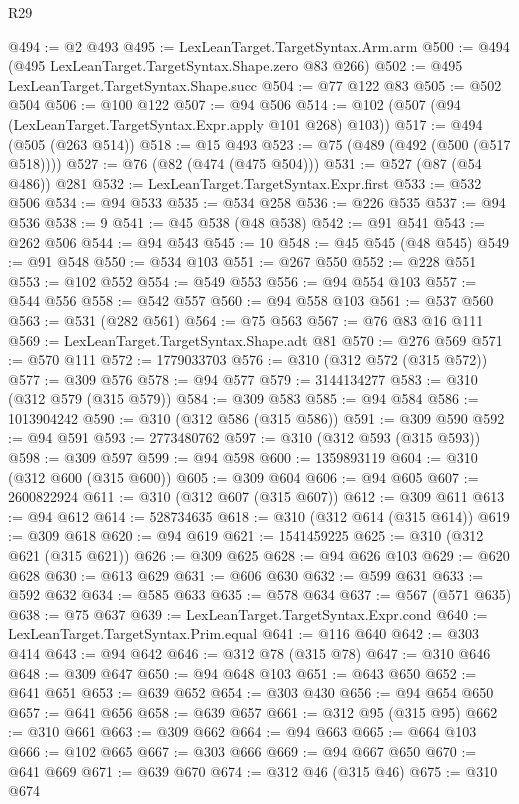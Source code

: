 \begin{lexlean}{R29}
\begin{coremodule}
@494 := @2 @493
@495 := LexLeanTarget.TargetSyntax.Arm.arm
@500 := @494 (@495 LexLeanTarget.TargetSyntax.Shape.zero @83 @266)
@502 := @495 LexLeanTarget.TargetSyntax.Shape.succ
@504 := @77 @122 @83
@505 := @502 @504
@506 := @100 @122
@507 := @94 @506
@514 := @102 (@507 (@94 (LexLeanTarget.TargetSyntax.Expr.apply @101 @268) @103))
@517 := @494 (@505 (@263 @514))
@518 := @15 @493
@523 := @75 (@489 (@492 (@500 (@517 @518))))
@527 := @76 (@82 (@474 (@475 @504)))
@531 := @527 (@87 (@54 @486)) @281
@532 := LexLeanTarget.TargetSyntax.Expr.first
@533 := @532 @506
@534 := @94 @533
@535 := @534 @258
@536 := @226 @535
@537 := @94 @536
@538 := 9
@541 := @45 @538 (@48 @538)
@542 := @91 @541
@543 := @262 @506
@544 := @94 @543
@545 := 10
@548 := @45 @545 (@48 @545)
@549 := @91 @548
@550 := @534 @103
@551 := @267 @550
@552 := @228 @551
@553 := @102 @552
@554 := @549 @553
@556 := @94 @554 @103
@557 := @544 @556
@558 := @542 @557
@560 := @94 @558 @103
@561 := @537 @560
@563 := @531 (@282 @561)
@564 := @75 @563
@567 := @76 @83 @16 @111
@569 := LexLeanTarget.TargetSyntax.Shape.adt @81
@570 := @276 @569
@571 := @570 @111
@572 := 1779033703
@576 := @310 (@312 @572 (@315 @572))
@577 := @309 @576
@578 := @94 @577
@579 := 3144134277
@583 := @310 (@312 @579 (@315 @579))
@584 := @309 @583
@585 := @94 @584
@586 := 1013904242
@590 := @310 (@312 @586 (@315 @586))
@591 := @309 @590
@592 := @94 @591
@593 := 2773480762
@597 := @310 (@312 @593 (@315 @593))
@598 := @309 @597
@599 := @94 @598
@600 := 1359893119
@604 := @310 (@312 @600 (@315 @600))
@605 := @309 @604
@606 := @94 @605
@607 := 2600822924
@611 := @310 (@312 @607 (@315 @607))
@612 := @309 @611
@613 := @94 @612
@614 := 528734635
@618 := @310 (@312 @614 (@315 @614))
@619 := @309 @618
@620 := @94 @619
@621 := 1541459225
@625 := @310 (@312 @621 (@315 @621))
@626 := @309 @625
@628 := @94 @626 @103
@629 := @620 @628
@630 := @613 @629
@631 := @606 @630
@632 := @599 @631
@633 := @592 @632
@634 := @585 @633
@635 := @578 @634
@637 := @567 (@571 @635)
@638 := @75 @637
@639 := LexLeanTarget.TargetSyntax.Expr.cond
@640 := LexLeanTarget.TargetSyntax.Prim.equal
@641 := @116 @640
@642 := @303 @414
@643 := @94 @642
@646 := @312 @78 (@315 @78)
@647 := @310 @646
@648 := @309 @647
@650 := @94 @648 @103
@651 := @643 @650
@652 := @641 @651
@653 := @639 @652
@654 := @303 @430
@656 := @94 @654 @650
@657 := @641 @656
@658 := @639 @657
@661 := @312 @95 (@315 @95)
@662 := @310 @661
@663 := @309 @662
@664 := @94 @663
@665 := @664 @103
@666 := @102 @665
@667 := @303 @666
@669 := @94 @667 @650
@670 := @641 @669
@671 := @639 @670
@674 := @312 @46 (@315 @46)
@675 := @310 @674

\end{coremodule}
\end{lexlean}
